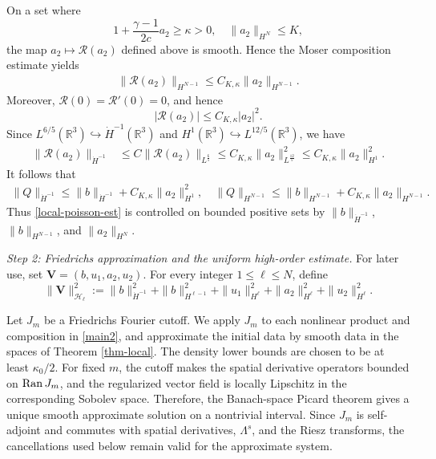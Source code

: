 \documentclass[10pt,reqno]{amsart}
\numberwithin{equation}{section}
\begin{document}
On a set where
\[
1+\frac{\gamma-1}{2c}a_2\ge\kappa>0,
\quad
\|a_2\|_{H^N}\le K,
\]
the map $a_2\mapsto\mathcal R(a_2)$ defined above is smooth. Hence the Moser composition estimate yields
\begin{align}\label{local-R-HN}
\|\mathcal R(a_2)\|_{H^{N-1}} \le C_{K,\kappa}\|a_2\|_{H^{N-1}}.
\end{align}
Moreover, $\mathcal R(0)=\mathcal R'(0)=0$, and hence
\[
|\mathcal R(a_2)| \le C_{K,\kappa}|a_2|^2.
\]
Since $L^{6/5}(\mathbb R^3)\hookrightarrow\dot H^{-1}(\mathbb R^3)$ and $H^1(\mathbb R^3)\hookrightarrow L^{12/5}(\mathbb R^3)$, we have
\begin{align}\label{local-R-negative}
\|\mathcal R(a_2)\|_{\dot H^{-1}}
&\le C\|\mathcal R(a_2)\|_{L^{\frac65}}
\le C_{K,\kappa}\|a_2\|_{L^{\frac{12}{5}}}^2
\le C_{K,\kappa}\|a_2\|_{H^1}^2.
\end{align}
It follows that
\begin{align}\label{local-Q-from-b}
\|Q\|_{\dot H^{-1}} \le \|b\|_{\dot H^{-1}} +C_{K,\kappa}\|a_2\|_{H^1}^2,\quad \|Q\|_{H^{N-1}} \le \|b\|_{H^{N-1}} +C_{K,\kappa}\|a_2\|_{H^{N-1}}.
\end{align}
Thus \eqref{local-poisson-est} is controlled on bounded positive sets by $\|b\|_{\dot H^{-1}}$, $\|b\|_{H^{N-1}}$, and $\|a_2\|_{H^N}$. 

\medskip
\noindent\emph{Step 2: Friedrichs approximation and the uniform high-order estimate.} For later use, set $\mathbf V=(b,u_1,a_2,u_2)$. For every integer $1\le \ell\le N$, define
\[%
\|\mathbf V\|_{\mathscr H_\ell}^2 :=\|b\|_{\dot H^{-1}}^2 +\|b\|_{H^{\ell-1}}^2 +\|u_1\|_{H^\ell}^2 +\|a_2\|_{H^\ell}^2 +\|u_2\|_{H^\ell}^2.
\]%

Let $J_m$ be a Friedrichs Fourier cutoff. We apply $J_m$ to each nonlinear product and composition in \eqref{main2}, and approximate the initial data by smooth data in the spaces of Theorem \ref{thm-local}. The density lower bounds are chosen to be at least $\kappa_0/2$. For fixed $m$, the cutoff makes the spatial derivative operators bounded on ${\rm Ran}\,J_m$, and the regularized vector field is locally Lipschitz in the corresponding Sobolev space. Therefore, the Banach-space Picard theorem gives a unique smooth approximate solution on a nontrivial interval. Since $J_m$ is self-adjoint and commutes with spatial derivatives, $\Lambda^s$, and the Riesz transforms, the cancellations used below remain valid for the approximate system.
\end{document}
